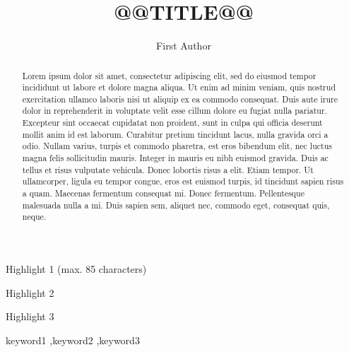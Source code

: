\documentclass[a4paper,fleqn]{cas-sc}
\begin{document}
\let\WriteBookmarks\relax
\def\floatpagepagefraction{1}
\def\textpagefraction{.001}


\title[mode = title]{@@TITLE@@}

\author[1]{First Author}
\cormark[1]



\begin{abstract}
Lorem ipsum dolor sit amet, consectetur adipiscing elit, sed do eiusmod tempor incididunt ut labore et dolore magna aliqua. Ut enim ad minim veniam, quis nostrud exercitation ullamco laboris nisi ut aliquip ex ea commodo consequat. Duis aute irure dolor in reprehenderit in voluptate velit esse cillum dolore eu fugiat nulla pariatur. Excepteur sint occaecat cupidatat non proident, sunt in culpa qui officia deserunt mollit anim id est laborum. Curabitur pretium tincidunt lacus, nulla gravida orci a odio. Nullam varius, turpis et commodo pharetra, est eros bibendum elit, nec luctus magna felis sollicitudin mauris. Integer in mauris eu nibh euismod gravida. Duis ac tellus et risus vulputate vehicula. Donec lobortis risus a elit. Etiam tempor. Ut ullamcorper, ligula eu tempor congue, eros est euismod turpis, id tincidunt sapien risus a quam. Maecenas fermentum consequat mi. Donec fermentum. Pellentesque malesuada nulla a mi. Duis sapien sem, aliquet nec, commodo eget, consequat quis, neque.
\end{abstract}

\begin{highlights}
\item Highlight 1 (max. 85 characters)
\item Highlight 2
\item Highlight 3
\end{highlights}

\begin{keywords}
keyword1 \sep keyword2 \sep keyword3
\end{keywords}

\maketitle
\end{document}
